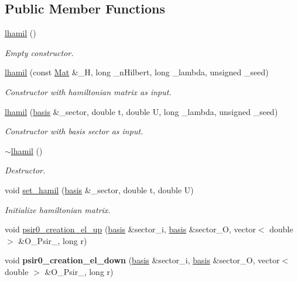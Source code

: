 \subsection*{Public Member Functions}
\begin{DoxyCompactItemize}
\item 
\hyperlink{classlhamil_af343dc2e4bfd934b75c9fcc937e61541}{lhamil} ()\hypertarget{classlhamil_af343dc2e4bfd934b75c9fcc937e61541}{}\label{classlhamil_af343dc2e4bfd934b75c9fcc937e61541}

\begin{DoxyCompactList}\small\item\em Empty constructor. \end{DoxyCompactList}\item 
\hyperlink{classlhamil_a56a9ef60b6e49e9b16c9bac3a16c5ef3}{lhamil} (const \hyperlink{classMat}{Mat} \&\+\_\+H, long \+\_\+n\+Hilbert, long \+\_\+lambda, unsigned \+\_\+seed)
\begin{DoxyCompactList}\small\item\em Constructor with hamiltonian matrix as input. \end{DoxyCompactList}\item 
\hyperlink{classlhamil_ad72484031ce3deeaae33010586b43a57}{lhamil} (\hyperlink{classbasis}{basis} \&\+\_\+sector, double t, double U, long \+\_\+lambda, unsigned \+\_\+seed)
\begin{DoxyCompactList}\small\item\em Constructor with basis sector as input. \end{DoxyCompactList}\item 
\hyperlink{classlhamil_a1ecb745a224ee151b17dd1ab0e685837}{$\sim$lhamil} ()\hypertarget{classlhamil_a1ecb745a224ee151b17dd1ab0e685837}{}\label{classlhamil_a1ecb745a224ee151b17dd1ab0e685837}

\begin{DoxyCompactList}\small\item\em Destructor. \end{DoxyCompactList}\item 
void \hyperlink{classlhamil_ac7b1eb29c1383cc9569360d8b59e8c00}{set\+\_\+hamil} (\hyperlink{classbasis}{basis} \&\+\_\+sector, double t, double U)
\begin{DoxyCompactList}\small\item\em Initialize hamiltonian matrix. \end{DoxyCompactList}\item 
void \hyperlink{classlhamil_aca9b0a900976caca5177816d8d6d9523}{psir0\+\_\+creation\+\_\+el\+\_\+up} (\hyperlink{classbasis}{basis} \&sector\+\_\+i, \hyperlink{classbasis}{basis} \&sector\+\_\+O, vector$<$ double $>$ \&O\+\_\+\+Psir\+\_, long r)
\item 
void {\bfseries psir0\+\_\+creation\+\_\+el\+\_\+down} (\hyperlink{classbasis}{basis} \&sector\+\_\+i, \hyperlink{classbasis}{basis} \&sector\+\_\+O, vector$<$ double $>$ \&O\+\_\+\+Psir\+\_, long r)\hypertarget{classlhamil_a7465d5adfdcb843f7eeb511491028073}{}\label{classlhamil_a7465d5adfdcb843f7eeb511491028073}


\end{DoxyCompactItemize}
